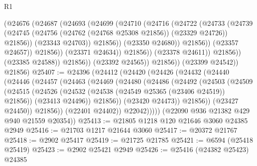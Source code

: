 \begin{lexlean}{R1}
\begin{coremodule}
                                  (@24676
                                    (@24687
                                      (@24693
                                        (@24699
                                          (@24710
                                            (@24716
                                              (@24722
                                                (@24733
                                                  (@24739
                                                    (@24745
                                                      (@24756
                                                        (@24762 (@24768 @25308 @21856))
                                                        (@23329 @24726))
                                                      @21856))
                                                  (@23343 @24703))
                                                @21856))
                                            (@23350 @24680))
                                          @21856))
                                      (@23357 @24657))
                                    @21856))
                                (@23371 @24634))
                              @21856))
                          (@23378 @24611))
                        @21856))
                    (@23385 @24588))
                  @21856))
              (@23392 @24565))
            @21856))
        (@23399 @24542))
      @21856)
@25407 := @24396
    (@24412
      (@24420
        (@24426
          (@24432
            (@24440
              (@24446
                (@24457
                  (@24463
                    (@24469
                      (@24480
                        (@24486
                          (@24492
                            (@24503
                              (@24509
                                (@24515
                                  (@24526
                                    (@24532 (@24538 (@24549 @25365 (@23406 @24519)) @21856))
                                    (@23413 @24496))
                                  @21856))
                              (@23420 @24473))
                            @21856))
                        (@23427 @24450))
                      @21856))
                  (@22401 @24402))
                @22042)))))
      (@22090 @936 @21382 @429 @940 @21559 @20354))
@25413 := @21805 @1218 @120 @21646 @3060 @24385 @2949
@25416 := @21703 @1217 @21644 @3060
@25417 := @20372 @21767
@25418 := @2902 @25417
@25419 := @21725 @21785
@25421 := @6594 (@25418 @25419)
@25423 := @2902 @25421 @2949
@25426 := @25416 (@24382 @25423) @24385

\end{coremodule}
\end{lexlean}
